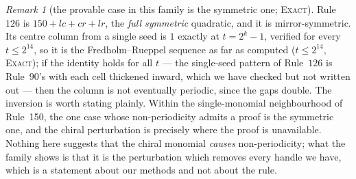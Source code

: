 \documentclass[11pt]{article}
\theoremstyle{definition}
\theoremstyle{remark}
\newtheorem{remark}[theorem]{Remark}
\newcommand{\EXACT}{\textsc{Exact}}
\begin{document}
\begin{remark}[the provable case in this family is the symmetric one; \EXACT]\label{du:rueppel}
Rule~$126$ is $150+lc+cr+lr$, the \emph{full symmetric} quadratic, and it is mirror-symmetric. Its
centre column from a single seed is $1$ exactly at $t=2^{k}-1$, verified for every $t\le2^{14}$, so it
is the Fredholm--Rueppel sequence \cite{Rueppel} as far as computed ($t\le2^{14}$, \EXACT); if the identity holds for all $t$ --- the single-seed pattern of Rule~$126$ is Rule~$90$'s with each cell thickened inward, which we have checked but not written out --- then the column is not eventually periodic, since the gaps double.
The inversion is worth stating plainly. Within the single-monomial neighbourhood of Rule~150, the one
case whose non-periodicity admits a proof is the symmetric one, and the chiral perturbation is precisely
where the proof is unavailable. Nothing here suggests that the chiral monomial \emph{causes}
non-periodicity; what the family shows is that it is the perturbation which removes every handle we
have, which is a statement about our methods and not about the rule.
\end{remark}
\end{document}

